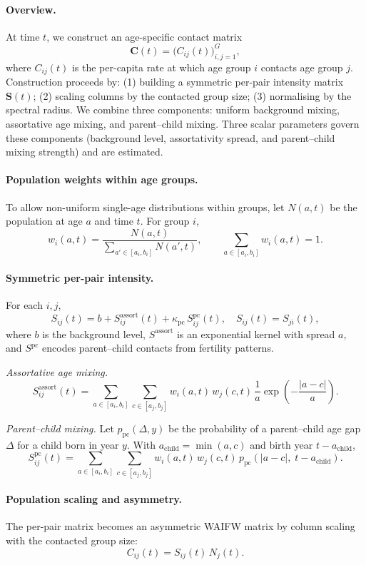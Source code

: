 \documentclass[11pt]{article}
\begin{document}
\paragraph{Overview.}
At time \(t\), we construct an age-specific contact matrix
\[
\mathbf{C}(t) = \big(C_{ij}(t)\big)_{i,j=1}^G,
\]
where \(C_{ij}(t)\) is the per-capita rate at which age group \(i\) contacts age group \(j\). Construction proceeds by:
(1) building a symmetric per-pair intensity matrix \(\mathbf{S}(t)\);
(2) scaling columns by the contacted group size;
(3) normalising by the spectral radius.
We combine three components: uniform background mixing, assortative age mixing, and parent–child mixing. Three scalar parameters govern these components (background level, assortativity spread, and parent–child mixing strength) and are estimated.

\paragraph{Population weights within age groups.}
To allow non-uniform single-age distributions within groups, let \(N(a,t)\) be the population at age \(a\) and time \(t\). For group \(i\),
\[
w_i(a,t) = \frac{N(a,t)}{\sum_{a' \in [a_i,b_i]} N(a',t)},\qquad
\sum_{a \in [a_i,b_i]} w_i(a,t)=1.
\]

\paragraph{Symmetric per-pair intensity.}
For each \(i,j\),
\[
S_{ij}(t) = b + S^{\mathrm{assort}}_{ij}(t) + \kappa_{\mathrm{pc}}\, S^{\mathrm{pc}}_{ij}(t),
\quad S_{ij}(t)=S_{ji}(t),
\]
where \(b\) is the background level, \(S^{\mathrm{assort}}\) is an exponential kernel with spread \(a\), and \(S^{\mathrm{pc}}\) encodes parent–child contacts from fertility patterns.

\emph{Assortative age mixing.}
\[
S^{\mathrm{assort}}_{ij}(t)
=
\sum_{a \in [a_i,b_i]}
\sum_{c \in [a_j,b_j]}
w_i(a,t)\, w_j(c,t)\,
\frac{1}{a}
\exp\!\left(-\frac{|a-c|}{a}\right).
\]

\emph{Parent–child mixing.}
Let \(p_{\mathrm{pc}}(\Delta, y)\) be the probability of a parent–child age gap \(\Delta\) for a child born in year \(y\). With \(a_{\mathrm{child}}=\min(a,c)\) and birth year \(t-a_{\mathrm{child}}\),
\[
S^{\mathrm{pc}}_{ij}(t)
=
\sum_{a \in [a_i,b_i]}
\sum_{c \in [a_j,b_j]}
w_i(a,t)\, w_j(c,t)\,
p_{\mathrm{pc}}\!\left(|a-c|,\; t - a_{\mathrm{child}}\right).
\]

\paragraph{Population scaling and asymmetry.}
The per-pair matrix becomes an asymmetric WAIFW matrix by column scaling with the contacted group size:
\[
C_{ij}(t) = S_{ij}(t)\, N_j(t).
\]
\end{document}
